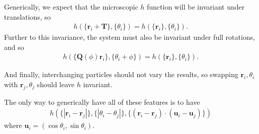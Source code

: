 \documentclass{article}
\begin{document}
Generically, we expect that the microscopic $h$ function will be invariant under translations,
so
\begin{align}
  h(\{\bm{r}_i+\bm{T}\},\{\theta_i\}) = h(\{\bm{r}_i\},\{\theta_i\}).
\end{align}
Further to this invariance, the system must also be invariant
under full rotations, and so
\begin{align}
  h(\{\bm{Q}(\phi)\bm{r}_i\},\{\theta_i+\phi\})
  =h(\{\bm{r}_i\},\{\theta_i\}).
\end{align}

And finally, interchanging particles should not vary the results, so swapping $\bm{r}_i,\theta_i$
with $\bm{r}_j,\theta_j$ should leave $h$ invariant.

The only way to generically have all of these features is to have
\begin{align}
  h(\{|\bm{r}_i-\bm{r}_j|\},\{|\theta_i-\theta_j|\},
  \{(\bm{r}_i-\bm{r}_j)\cdot(\bm{u}_i-\bm{u}_j)\})
\end{align}
where $\bm{u}_i = (\cos\theta_i,\sin\theta_i)$.
\end{document}
